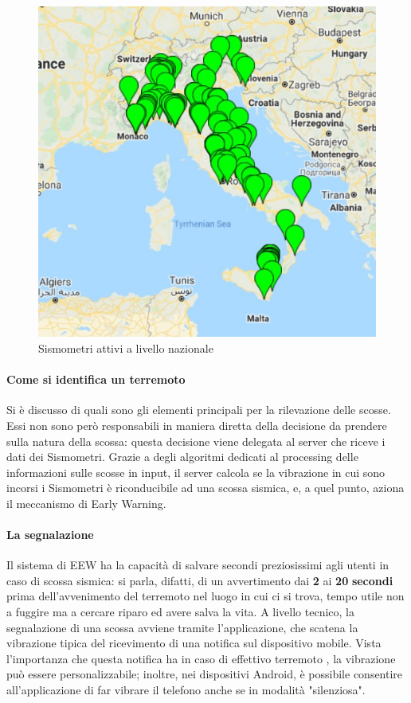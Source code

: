 \begin{figure}[h!]
    \centering
    \includegraphics[width=\textwidth]{images/seismometersjpg.jpg}
    \caption{Sismometri attivi a livello nazionale}
    \label{fig:seismometers}
\end{figure}

\paragraph{Come si identifica un terremoto}
Si è discusso di quali sono gli elementi principali per la rilevazione delle scosse. Essi non sono però responsabili in maniera diretta della decisione da prendere sulla natura della scossa: questa decisione viene delegata al server che riceve i dati dei Sismometri. Grazie a degli algoritmi dedicati al processing delle informazioni sulle scosse in input, il server calcola se la vibrazione in cui sono incorsi i Sismometri è riconducibile ad una scossa sismica, e, a quel punto, aziona il meccanismo di Early Warning. 

\paragraph{La segnalazione}
Il sistema di EEW ha la capacità di salvare secondi preziosissimi agli utenti in caso di scossa sismica: si parla, difatti, di un avvertimento dai \textbf{2} ai \textbf{20} \textbf{secondi} prima dell'avvenimento del terremoto nel luogo in cui ci si trova, tempo utile non a fuggire ma a cercare riparo ed avere salva la vita.
A livello tecnico, la segnalazione di una scossa avviene tramite l'applicazione, che scatena la vibrazione tipica del ricevimento di una notifica sul dispositivo mobile. Vista l'importanza che questa notifica ha in caso di effettivo terremoto , la vibrazione può essere personalizzabile; inoltre, nei dispositivi Android, è possibile consentire all'applicazione di far vibrare il telefono anche se in modalità "silenziosa".

